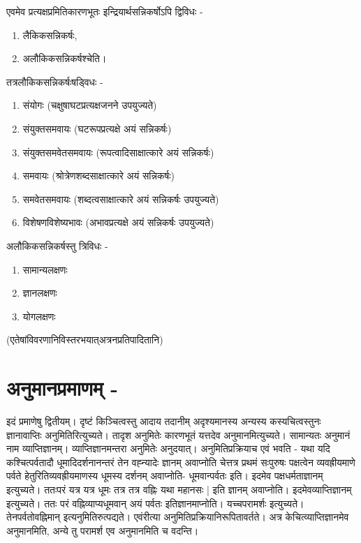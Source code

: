 एवमेव प्रत्यक्षप्रमितिकारणभूतः इन्द्रियार्थसन्निकर्षोऽपि द्विविधः -
\begin{enumerate}
\item लैकिकसन्निकर्षः,
\item अलौकिकसन्निकर्षश्चेति।
\end{enumerate}
तत्रलौकिकसन्निकर्षःषड्विधः -
\begin{enumerate}
\item संयोगः (चक्षुषाघटप्रत्यक्षजनने उपयुज्यते)
\item	संयुक्तसमवायः (घटरूपप्रत्यक्षे अयं सन्निकर्षः)
\item	संयुक्तसमवेतसमवायः (रूपत्वादिसाक्षात्कारे अयं सन्निकर्षः)
\item 	समवायः (श्रोत्रेणशब्दसाक्षात्कारे अयं सन्निकर्षः)
\item 	समवेतसमवायः (शब्दत्वसाक्षात्कारे अयं सन्निकर्षः उपयुज्यते)
\item 	विशेषणविशेष्यभावः (अभावप्रत्यक्षे अयं सन्निकर्षः उपयुज्यते)
\end{enumerate}
अलौकिकसन्निकर्षस्तु त्रिविधः -
\begin{enumerate}
\item सामान्यलक्षणः
\item ज्ञानलक्षणः
\item योगलक्षणः
\end{enumerate}
(एतेषांविवरणानिविस्तरभयात्अत्रनप्रतिपादितानि)

\section*{अनुमानप्रमाणम् -}

इदं प्रमाणेषु द्वितीयम्। दृष्टं किञ्चित्वस्तु आदाय तदानीम् अदृश्यमानस्य अन्यस्य कस्यचित्वस्तुनः ज्ञानावाप्तिः अनुमितिरित्युच्यते। तादृश अनुमितेः कारणभूतं यत्तदेव अनुमानमित्युच्यते। सामान्यतः अनुमानं नाम व्याप्तिज्ञानम्। व्याप्तिज्ञानमन्तरा अनुमितेः अनुदयात्। अनुमितिप्रक्रियाच एवं भवति - यथा यदि कश्चित्पर्वतादौ धूमादिदर्शनानन्तरं तेन वह्न्यादेः ज्ञानम् अवाप्नोति चेत्तत्र प्रथमं सःपुरुषः पक्षत्वेन व्यवह्रीयमाणे पर्वते हेतुरितिव्यवह्रीयमाणस्य धूमस्य दर्शनम् अवाप्नोति- धूमवान्पर्वतः इति। इदमेव पक्षधर्मताज्ञानम् इत्युच्यते। ततःपरं यत्र यत्र धूमः तत्र तत्र वह्निः यथा महानसः | इति ज्ञानम् अवाप्नोति। इदमेवव्याप्तिज्ञानम् इत्युच्यते। ततः परं वह्निव्याप्यधूमवान् अयं पर्वतः इतिज्ञानमाप्नोति। यच्चपरामर्शः इत्युच्यते। तेनपर्वतोवह्निमान् इत्यनुमितिरुत्पद्यते। एवंरीत्या अनुमितिप्रक्रियानिरूपितावर्तते। अत्र केचित्व्याप्तिज्ञानमेव अनुमानमिति, अन्ये तु परामर्श एव अनुमानमिति च वदन्ति।

